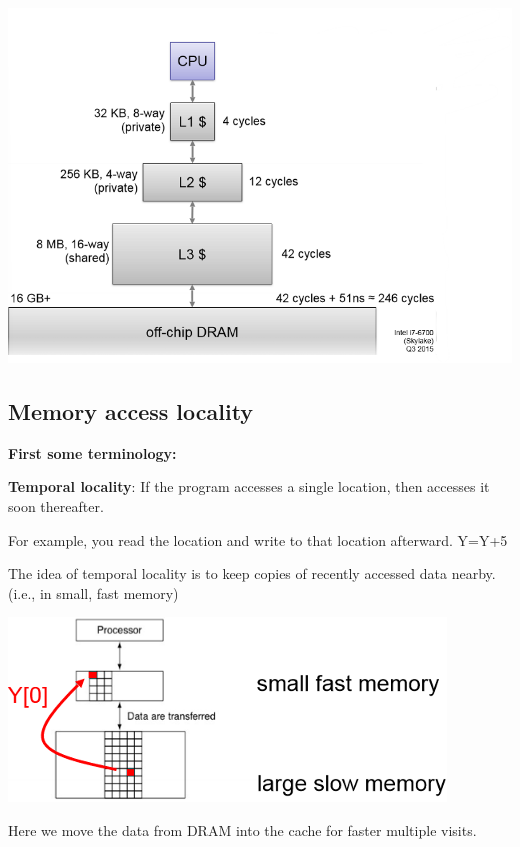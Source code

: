 \documentclass[letterpaper,12pt]{article}
\begin{document}
\includegraphics*[scale = 0.8]{./Image/CPU_mem_hierarchy.png}


\subsection{Memory access locality}

\textbf{First some terminology:}

\textbf{Temporal locality}: If the program accesses a single location, then accesses it soon thereafter.

For example, you read the location and write to that location afterward. Y=Y+5

The idea of temporal locality is to keep copies of recently accessed data nearby. (i.e., in small, fast memory)

\includegraphics*{./Image/Exploiting temporal locality.png}

Here we move the data from DRAM into the cache for faster multiple visits.
\end{document}
